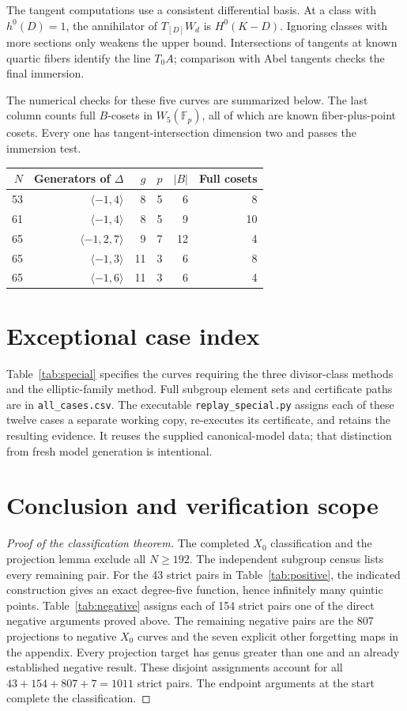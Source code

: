 \documentclass[11pt]{article}
\newcommand{\Fp}{\mathbb F_p}
\theoremstyle{remark}\newtheorem{remark}[theorem]{Remark}
\begin{document}
The tangent computations use a consistent differential basis. At a class
with $h^0(D)=1$, the annihilator of $T_{[D]}W_d$ is $H^0(K-D)$.
Ignoring classes with more sections only weakens the upper bound.
Intersections of tangents at known quartic fibers identify the line
$T_0A$; comparison with Abel tangents checks the final immersion.

The numerical checks for these five curves are summarized below. The
last column counts full $B$-cosets in $W_5(\Fp)$, all of which are known
fiber-plus-point cosets. Every one has tangent-intersection dimension two
and passes the immersion test.
\begin{center}\small
\begin{tabular}{rrrrrr}\toprule
$N$ & Generators of $\Delta$ & $g$ & $p$ & $|B|$ & Full cosets\\\midrule
53 & $\langle-1,4\rangle$ & 8 & 5 & 6 & 8\\
61 & $\langle-1,4\rangle$ & 8 & 5 & 9 & 10\\
65 & $\langle-1,2,7\rangle$ & 9 & 7 & 12 & 4\\
65 & $\langle-1,3\rangle$ & 11 & 3 & 6 & 8\\
65 & $\langle-1,6\rangle$ & 11 & 3 & 6 & 4\\\bottomrule
\end{tabular}
\end{center}

\section{Exceptional case index}
Table~\ref{tab:special} specifies the curves requiring the three
divisor-class methods and the elliptic-family method. Full subgroup
element sets and certificate paths are in \texttt{all\_cases.csv}.
The executable \texttt{replay\_special.py} assigns each of these twelve
cases a separate working copy, re-executes its certificate, and retains
the resulting evidence. It reuses the supplied canonical-model data;
that distinction from fresh model generation is intentional.
\begingroup\small

\endgroup

\section{Conclusion and verification scope}
\begin{proof}[Proof of the classification theorem]
The completed $X_0$ classification and the projection lemma exclude all
$N\ge192$. The independent subgroup census lists every remaining pair.
For the 43 strict pairs in Table~\ref{tab:positive}, the indicated
construction gives an exact degree-five function, hence infinitely many
quintic points. Table~\ref{tab:negative} assigns each of 154 strict pairs
one of the direct negative arguments proved above. The remaining negative
pairs are the 807 projections to negative $X_0$ curves and the seven
explicit other forgetting maps in the appendix. Every projection target
has genus greater than one and an already established negative result.
These disjoint assignments account for all $43+154+807+7=1011$ strict
pairs. The endpoint arguments at the start complete the classification.
\end{proof}
\end{document}

